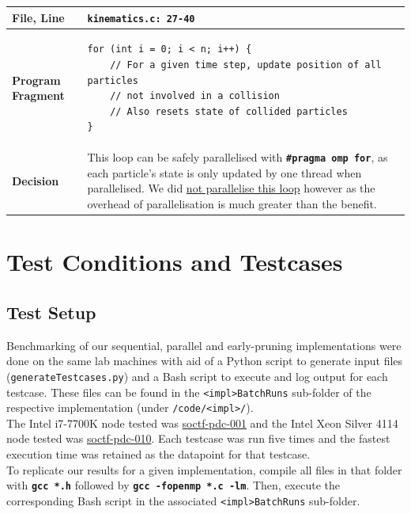 \documentclass[12pt]{article}
\newcommand{\bt}[1]{\texttt{\textbf{#1}}}
\begin{document}
\begin{center}
\begin{tabular}{ | m{5em} | m{33em} | } 
\hline
\textbf{File, Line} & \bt{kinematics.c: 27-40} \\ \hline
\textbf{Program Fragment} &
\begin{verbatim}
for (int i = 0; i < n; i++) {
    // For a given time step, update position of all particles
    // not involved in a collision
    // Also resets state of collided particles
}
\end{verbatim}
\\ \hline
\textbf{Decision} &
This loop can be safely parallelised with \bt{\#pragma omp for}, as each particle’s state is only updated by one thread when parallelised. We did \ul{not parallelise this loop} however as the overhead of parallelisation is much greater than the benefit.
\\ \hline
\end{tabular}
\end{center}

\pagebreak

\section{Test Conditions and Testcases}

\subsection{Test Setup}

Benchmarking of our sequential, parallel and early-pruning implementations were done on the same lab machines with aid of a Python script to generate input files (\texttt{generateTestcases.py}) and a Bash script to execute and log output for each testcase. These files can be found in the \texttt{<impl>BatchRuns} sub-folder of the respective implementation (under \texttt{/code/<impl>/}). \\

The Intel i7-7700K node tested was \ul{soctf-pdc-001} and the Intel Xeon Silver 4114 node tested was \ul{soctf-pdc-010}. Each testcase was run five times and the fastest execution time was retained as the datapoint for that testcase. \\

To replicate our results for a given implementation, compile all files in that folder with \bt{gcc *.h} followed by \bt{gcc -fopenmp *.c -lm}. Then, execute the corresponding Bash script in the associated \texttt{<impl>BatchRuns} sub-folder.
\end{document}

